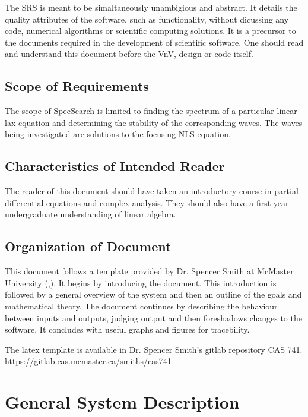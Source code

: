 \documentclass[12pt]{article}
\begin{document}
The SRS is meant to be simaltaneously unambigious and abstract. It details the 
quality attributes of the software, such as functionality, 
without dicussing any code, numerical algorithms or scientific computing 
solutions. It is a precursor to the documents required in the development of 
scientific software. One should read and understand this document before the 
VnV, design or code itself. 

\subsection{Scope of Requirements} 

The scope of SpecSearch is limited to finding the spectrum of a particular 
linear lax equation and determining the stability of the corresponding waves. 
The waves being investigated are solutions to 
the focusing NLS equation. 

\subsection{Characteristics of Intended Reader} 

The reader of this document should have taken an introductory course 
in partial differential equations and complex analysis. They should also have a 
first year undergraduate understanding of linear algebra.

\subsection{Organization of Document}

This document follows a template provided by Dr. Spencer Smith at McMaster 
University (\cite{SmithAndLai2005},\cite{SmithEtAl2007}). It begins by 
introducing the document. This 
introduction is 
followed by a general overview of the system and then an outline of the goals 
and mathematical theory. The document continues by describing the behaviour 
between inputs 
and outputs, judging output and then foreshadows changes to the software. It 
concludes with useful graphs and figures for tracebility. 

The latex template is available in Dr. Spencer Smith's gitlab 
repository CAS 741. \url{https://gitlab.cas.mcmaster.ca/smiths/cas741}

\section{General System Description}
\end{document}
